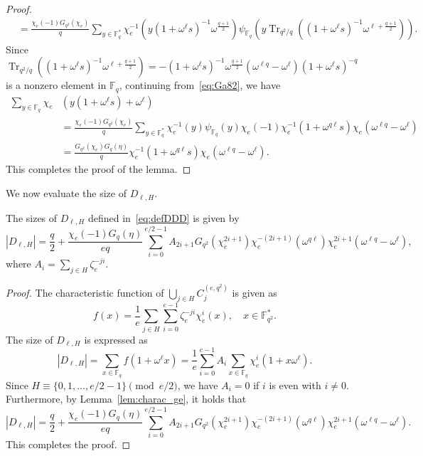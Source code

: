 \documentclass[ALCO,ThmDefs,Unicode]{cedram}
\DeclareMathOperator{\Tr}{Tr}
\newcommand*\F{{\mathbb F}}
\begin{document}
\begin{proof}
\begin{align}
&=\frac{\chi_e(-1)G_{q^2}(\chi_e)}{q}\sum_{y\in \F_q^\ast}\chi_e^{-1}(y (1+\omega^\ell s)^{-1}\omega^\frac{q+1}{2})\psi_{\F_q}(y\Tr_{q^2/q}((1+\omega^\ell s)^{-1}\omega^{\ell+\frac{q+1}{2}})). \label{eq:Ga82}
\end{align}
Since $\Tr_{q^2/q}((1+\omega^\ell s)^{-1}\omega^{\ell+\frac{q+1}{2}})=-(1+\omega^\ell s)^{-1}\omega^\frac{q+1}{2}(\omega^{\ell q}-\omega^\ell)(1+\omega^\ell s)^{-q}$ is a nonzero element in $\F_q$, continuing from~\eqref{eq:Ga82}, we have
\begin{align*}
\sum_{y\in \F_q}\chi_e&(y(1+\omega^\ell s)+\omega^\ell)\\
&=\frac{\chi_e(-1)G_{q^2}(\chi_e)}{q}\sum_{y\in \F_q^\ast}\chi_e^{-1}(y)\psi_{\F_q}(y)\chi_e(-1)\chi_e^{-1}(1+\omega^{q\ell}s)
\chi_e(\omega^{\ell q}-\omega^\ell)\\
&=\frac{G_{q^2}(\chi_e)G_q(\eta)}{q}\chi_e^{-1}(1+\omega^{q\ell}s)
\chi_e(\omega^{\ell q}-\omega^\ell).
\end{align*}
This completes the proof of the lemma.
\end{proof}

We now evaluate the size of $D_{\ell,H}$.

\begin{prop}\label{prop:sizeHH}
The sizes of $D_{\ell,H}$ defined in~\eqref{eq:defDDD} is given by
\begin{equation}\label{eq:sizeH}
|D_{\ell,H}|=\frac{q}{2}+\frac{\chi_e(-1)G_q(\eta)}{eq}\sum_{i=0}^{e/2-1} A_{2i+1} G_{q^2}(\chi_e^{2i+1})\chi_e^{-(2i+1)}(\omega^{q\ell})\chi_e^{2i+1}(\omega^{\ell q}-\omega^{\ell}),
\end{equation}
where $A_i=\sum_{j\in H}\zeta_e^{-ji}$.
\end{prop}

\begin{proof}
The characteristic function of $\bigcup_{j \in H}C_{j}^{(e,q^2)}$ is given as
\begin{equation}\label{eq:deff}
f(x)=\frac{1}{e}\sum_{j\in H}\sum_{i=0}^{e-1}\zeta_e^{-ji}\chi_e^i(x), \quad x\in \F_{q^2}^\ast.
\end{equation}
The size of $D_{\ell,H}$ is expressed as
\[
|D_{\ell,H}|=\sum_{x\in \F_q}f(1+\omega^\ell x)=\frac{1}{e}\sum_{i=0}^{e-1} A_i\sum_{x\in \F_q}\chi_e^i(1+x\omega^\ell).
\]
Since $H\equiv \{0,1,\ldots,e/2-1\}\pmod{e/2}$, we have $A_i=0$ if $i$ is even with $i\not=0$. Furthermore, by Lemma~\ref{lem:charac_ge}, it holds that
\[
|D_{\ell,H}|=\frac{q}{2}+\frac{\chi_e(-1)G_q(\eta)}{eq}\sum_{i=0}^{e/2-1} A_{2i+1} G_{q^2}(\chi_e^{2i+1})\chi_e^{-(2i+1)}(\omega^{q\ell})\chi_e^{2i+1}(\omega^{\ell q}-\omega^{\ell}).
\]
This completes the proof.
\end{proof}
\end{document}

